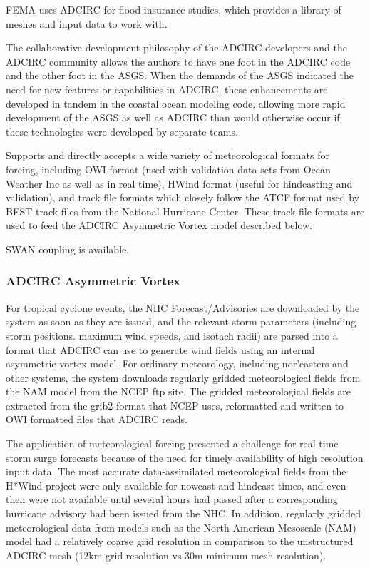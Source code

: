 \documentclass[12pt]{article}
\begin{document}
FEMA uses ADCIRC for flood insurance studies, which provides a library
of meshes and input data to work with.

The collaborative development philosophy of the ADCIRC developers
and the ADCIRC community allows the authors to have one foot in the
ADCIRC code and the other foot in the ASGS. When the demands of the
ASGS indicated the need for new features or capabilities in ADCIRC, 
these enhancements are developed in tandem in the coastal ocean modeling
code, allowing more rapid development of the ASGS as well as ADCIRC
than would otherwise occur if these technologies were developed by
separate teams. 

Supports and directly accepts a wide variety of meteorological 
formats for forcing, including OWI format (used with validation data 
sets from Ocean Weather Inc as well as in real time), HWind format 
(useful for hindcasting and validation), and track file formats which
closely follow the ATCF format used by BEST track files from the 
National Hurricane Center. These track file formats are used to feed
the ADCIRC Asymmetric Vortex model described below. 

SWAN coupling is available. 

\subsubsection{ADCIRC Asymmetric Vortex}

For tropical cyclone events, the NHC Forecast/Advisories are 
downloaded by the system as soon as they are issued, and the 
relevant storm parameters (including storm positions. maximum wind 
speeds, and isotach radii) are parsed into a format that ADCIRC can 
use to generate wind fields using an internal asymmetric vortex 
model. For ordinary meteorology, including nor'easters and other 
systems, the system downloads regularly gridded meteorological 
fields from the NAM model from the NCEP ftp site. The gridded 
meteorological fields are extracted from the grib2 format that NCEP 
uses, reformatted and written to OWI formatted files that ADCIRC 
reads. 

The application of meteorological forcing presented a challenge for 
real time storm surge forecasts because of the need for timely 
availability of high resolution input data. The most accurate 
data-assimilated meteorological fields from the H*Wind project were 
only available for nowcast and hindcast times, and even then were 
not available until several hours had passed after a corresponding 
hurricane advisory had been issued from the NHC. In addition, 
regularly gridded meteorological data from models such as the North 
American Mesoscale (NAM) model had a relatively coarse grid 
resolution in comparison to the unstructured ADCIRC mesh (12km grid 
resolution vs 30m minimum mesh resolution).
\end{document}
